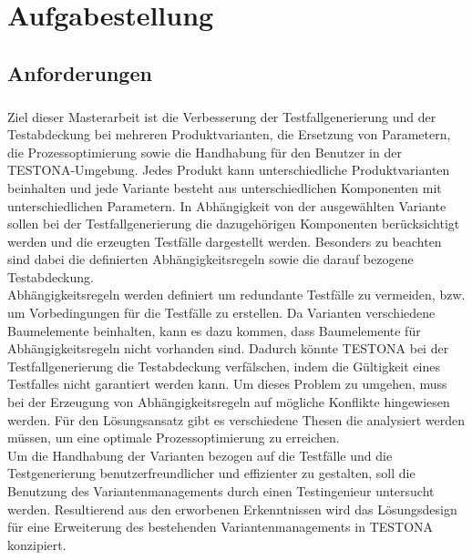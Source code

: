 
\chapter{Aufgabestellung}\label{chp:aufgabenstellung}

\section{Anforderungen}
\paragraph{}
Ziel dieser Masterarbeit ist die Verbesserung der Testfallgenerierung und der Testabdeckung bei mehreren Produktvarianten, die Ersetzung von Parametern, die Prozessoptimierung sowie die Handhabung für den Benutzer in der TESTONA-Umgebung. Jedes Produkt kann unterschiedliche Produktvarianten beinhalten und jede Variante besteht aus unterschiedlichen Komponenten mit unterschiedlichen Parametern. In Abhängigkeit von der ausgewählten Variante sollen bei der Testfallgenerierung die dazugehörigen Komponenten berücksichtigt werden und die erzeugten Testfälle dargestellt werden. Besonders zu beachten sind dabei die definierten Abhängigkeitsregeln sowie die darauf bezogene Testabdeckung.\\

Abhängigkeitsregeln werden definiert um redundante Testfälle zu vermeiden, bzw. um Vorbedingungen für die Testfälle zu erstellen. Da Varianten verschiedene Baumelemente beinhalten, kann es dazu kommen, dass Baumelemente für Abhängigkeitsregeln nicht vorhanden sind. Dadurch könnte TESTONA bei der Testfallgenerierung die Testabdeckung verfälschen, indem die Gültigkeit eines Testfalles nicht garantiert werden kann. Um dieses Problem zu umgehen, muss bei der Erzeugung von Abhängigkeitsregeln auf mögliche Konflikte hingewiesen werden. Für den Lösungsansatz gibt es verschiedene Thesen die analysiert werden müssen, um eine optimale Prozessoptimierung zu erreichen.\\

Um die Handhabung der Varianten bezogen auf die Testfälle und die Testgenerierung benutzerfreundlicher und effizienter zu gestalten, soll die Benutzung des Variantenmanagements durch einen Testingenieur untersucht werden. Resultierend aus den erworbenen Erkenntnissen wird das Lösungsdesign für eine Erweiterung des bestehenden Variantenmanagements in TESTONA konzipiert.\\

